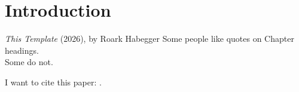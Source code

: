 \chapter{Introduction}
\label{chapter:intro}

\begin{wbepi}{\emph{This Template} (2026), by Roark Habegger}
Some people like quotes on Chapter headings. \\
Some do not. 
\end{wbepi}


I want to cite this paper: \citep{2013ApJ...765..131K}.